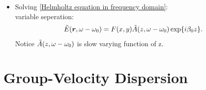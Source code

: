 \documentclass[12pt]{extarticle}
\numberwithin{equation}{section}
\numberwithin{figure}{section}
\numberwithin{table}{section}
\newcommand{\<}{\langle}
\renewcommand{\>}{\rangle}
\theoremstyle{definition}
\begin{document}
\begin{itemize}
            \item Solving \autoref{Helmholtz equation in frequency domain}:\\
            variable seperation:
            \begin{equation}
                \Tilde{E}(\boldsymbol{r},\omega-\omega_0)=F(x,y)\Tilde{A}(z,\omega-\omega_0)\exp{i\beta_0 z}.
            \end{equation}
            Notice $\Tilde{A}(z,\omega-\omega_0)$ is slow varying function of z. 
            
            
            
            
        \end{itemize}
            
            
            
\newpage
\section{Group-Velocity Dispersion}
















\end{document}

